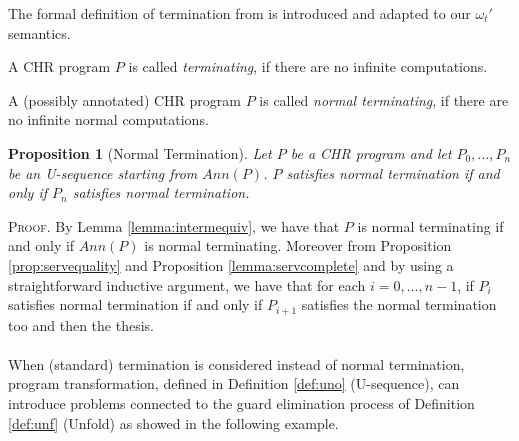 \documentclass[final]{acmtrans2e}
\newtheorem{proposition}[theorem]{Proposition}
\begin{document}
The formal definition of termination from \cite{Fru04}
is introduced and adapted to our $\omega_t'$ semantics.

\begin{definition}[Termination]
A CHR program $P$ is called \emph{terminating}, if there are no infinite computations.
\end{definition}

\begin{definition}
A (possibly annotated) CHR program $P$ is called  \emph{normal terminating}, if there are no infinite normal computations.
\end{definition}

\begin{proposition}[Normal Termination]\label{prop:termination} Let $P$ be a CHR program and
let $P_0, \ldots, P_n$ be an U-sequence starting from $Ann(P)$. $P$ satisfies
normal termination if and only if $P_n$  satisfies normal termination.
\end{proposition}
\textsc{Proof.}
By Lemma \ref{lemma:intermequiv}, we have that $P$ is normal terminating if and only if $Ann(P)$ is normal terminating.
Moreover from Proposition \ref{prop:servequality} and Proposition \ref{lemma:servcomplete} and by using a straightforward inductive argument, we have that
for each $i=0, \ldots,n-1$, if $P_i$ satisfies normal termination if and only if $P_{i+1}$ satisfies the normal termination too and then the thesis.
\\
\noindent{$\Box$} \\


When (standard) termination is considered instead of normal termination, program
transformation, defined in Definition \ref{def:uno} (U-sequence), can introduce
problems connected to the guard elimination process of Definition \ref{def:unf}
(Unfold) as showed in the following example.
\end{document}
